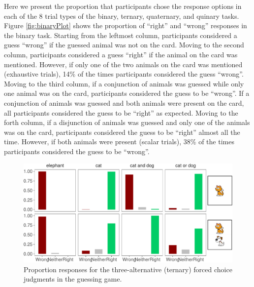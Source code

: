 \documentclass[floatsintext,man]{apa6}
\theoremstyle{definition}
\theoremstyle{definition}
\theoremstyle{definition}
\theoremstyle{remark}
\begin{document}
Here we present the proportion that participants chose the response
options in each of the 8 trial types of the binary, ternary, quaternary,
and quinary tasks. Figure \ref{fig:binaryPlot} shows the proportion of
\enquote{right} and \enquote{wrong} responses in the binary task.
Starting from the leftmost column, participants considered a guess
\enquote{wrong} if the guessed animal was not on the card. Moving to the
second column, participants considered a guess \enquote{right} if the
animal on the card was mentioned. However, if only one of the two
animals on the card was mentioned (exhaustive trials), 14\% of the times
participants considered the guess \enquote{wrong}. Moving to the third
column, if a conjunction of animals was guessed while only one animal
was on the card, participants considered the guess to be
\enquote{wrong}. If a conjunction of animals was guessed and both
animals were present on the card, all participants considered the guess
to be \enquote{right} as expected. Moving to the forth column, if a
disjunction of animals was guessed and only one of the animals was on
the card, participants considered the guess to be \enquote{right} almost
all the time. However, if both animals were present (scalar trials),
38\% of the times participants considered the guess to be
\enquote{wrong}.

\begin{figure}[t]

{\centering \includegraphics{writeup_files/figure-latex/ternaryPlot-1} 

}

\caption{Proportion responses for the three-alternative (ternary) forced choice judgments in the guessing game.}\label{fig:ternaryPlot}
\end{figure}
\end{document}
